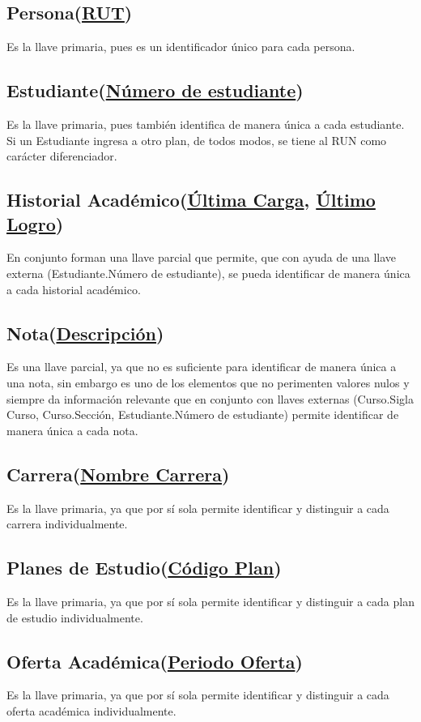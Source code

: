 \documentclass[12pt]{article}
\begin{document}
\subsection*{Persona(\underline{RUT})}
Es la llave primaria, pues es un identificador único para cada persona.  
\subsection*{Estudiante(\underline{Número de estudiante})}
Es la llave primaria, pues también identifica de manera única a cada estudiante. Si un Estudiante ingresa a otro plan, de todos modos, se tiene al RUN como carácter diferenciador. 
\subsection*{Historial Académico(\underline{Última Carga}, \underline{Último Logro})}
En conjunto forman una llave parcial que permite, que con ayuda de una llave externa (Estudiante.Número de estudiante), se pueda identificar de manera única a cada historial académico.
\subsection*{Nota(\underline{Descripción})}
Es una llave parcial, ya que no es suficiente para identificar de manera única a una nota, sin embargo
es uno de los elementos que no perimenten valores nulos y siempre da información relevante que en conjunto con llaves externas (Curso.Sigla Curso, Curso.Sección, Estudiante.Número de estudiante) permite identificar de manera única a cada nota.
\subsection*{Carrera(\underline{Nombre Carrera})}
Es la llave primaria, ya que por sí sola permite identificar y distinguir a cada carrera individualmente.
\subsection*{Planes de Estudio(\underline{Código Plan})}
Es la llave primaria, ya que por sí sola permite identificar y distinguir a cada plan de estudio individualmente.
\subsection*{Oferta Académica(\underline{Periodo Oferta})}
Es la llave primaria, ya que por sí sola permite identificar y distinguir a cada oferta académica individualmente.
\vspace*{0.5cm}
\end{document}
